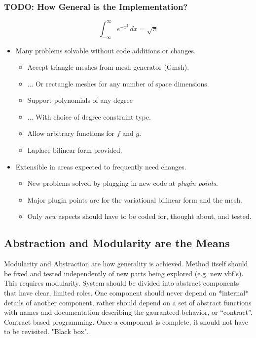 \documentclass{beamer}
\begin{document}
\begin{frame}
  \frametitle{TODO: How General is the Implementation?}
  \[
    \int_{-\infty}^\infty e^{-x^2} \, dx = \sqrt{\pi}
  \]
  \begin{itemize}
    \item Many problems solvable without code additions or changes.
      \begin{itemize}
        \item Accept triangle meshes from mesh generator (Gmsh).
        \item $\ldots$ Or rectangle meshes for any number of space dimensions.
        \item Support polynomials of any degree
        \item $\ldots$ With choice of degree constraint type.
        \item Allow arbitrary functions for $f$ and $g$.
        \item Laplace bilinear form provided. 
      \end{itemize}
    \item Extensible in areas expected to frequently need changes.
      \begin{itemize}
        \item New problems solved by plugging in new code at \emph{plugin points}.
        \item Major plugin points are for the variational bilinear form and the mesh.
        \item Only \emph{new} aspects should have to be coded for, thought about, and tested.  
      \end{itemize}
  \end{itemize}
\end{frame}


\subsection{Abstraction and Modularity are the Means}
\begin{frame}
  Modularity and Abstraction are how generality is achieved.
  Method itself should be fixed and tested independently of new parts being explored (e.g. new vbf's).
  This requires modularity.
  System should be divided into abstract components that have clear, limited roles.
  One component should never depend on *internal* details of another component, rather
  should depend on a set of abstract functions with names and documentation describing
  the gauranteed behavior, or ``contract''.  Contract based programming.
  Once a component is complete, it should not have to be revisited.
  "Black box".

\end{frame}
\end{document}
